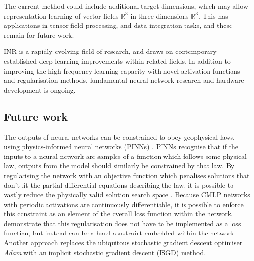 The current method could include additional target dimensions, which may allow representation learning of vector fields \(\mathbb{R}^{3}\) in three dimensions \(\mathbb{R}^{3}\).
This has applications in tensor field processing, and data integration tasks, and these remain for future work.

INR is a rapidly evolving field of research, and draws on contemporary established deep learning improvements within related fields.
In addition to improving the high-frequency learning capacity with novel activation functions and regularisation methods, fundamental neural network research and hardware development is ongoing.




\subsection{Future work}
\label{sec:future}
The outputs of neural networks can be constrained to obey geophysical laws, using physics-informed neural networks (PINNs) \parencite{raissiPhysicsinformedNeuralNetworks2019}.
PINNs recognise that if the inputs to a neural network are samples of a function which follows some physical law, outputs from the model should similarly be constrained by that law.
By regularising the network with an objective function which penalises solutions that don't fit the partial differential equations describing the law, it is possible to vastly reduce the physically valid solution search space \parencite{raissiPhysicsinformedNeuralNetworks2019}.
Because CMLP networks with periodic activations are continuously differentiable, it is possible to enforce this constraint as an element of the overall loss function within the network.
\Textcite{sethiHardEnforcementPhysicsinformed2023} demonstrate that this regularisation does not have to be implemented as a loss function, but instead can be a hard constraint embedded within the network.
Another approach \parencite{liImplicitStochasticGradient2023} replaces the ubiquitous stochastic gradient descent optimiser \emph{Adam} with an implicit stochastic gradient descent (ISGD) method.

